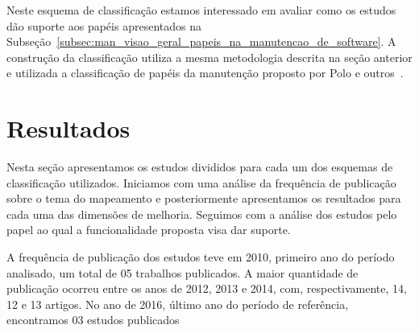 Neste esquema de classificação estamos interessado em avaliar como os estudos
dão suporte aos papéis apresentados na
Subseção~\ref{subsec:man_visao_geral_papeis_na_manutencao_de_software}. A
construção da classificação utiliza a mesma metodologia descrita na seção
anterior e utilizada a classificação de papéis da manutenção proposto por Polo e
outros~\cite{Polo1999}.

\section{Resultados}
\label{sec:mapeamento_resultados}

Nesta seção apresentamos os estudos divididos para cada um dos esquemas de
classificação utilizados. Iniciamos com uma análise da frequência de publicação
sobre o tema do mapeamento e posteriormente apresentamos os resultados para cada
uma das dimensões de melhoria. Seguimos com a análise dos estudos pelo papel ao
qual a funcionalidade proposta visa dar suporte.

A frequência de publicação dos estudos teve em 2010, primeiro ano do período
analisado, um total de 05 trabalhos publicados. A maior quantidade de publicação
ocorreu entre os anos de 2012, 2013 e 2014, com, respectivamente, 14, 12 e 13
artigos. No ano de 2016, último ano do período de referência, encontramos 03
estudos publicados




